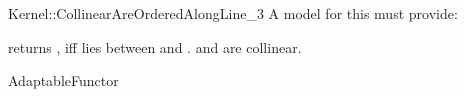 \begin{ccRefFunctionObjectConcept}{Kernel::CollinearAreOrderedAlongLine_3}
A model for this must provide:


         {returns , iff  lies between  
          and . \ccPrecond {} and  are 
          collinear.}

\ccRefines
AdaptableFunctor

\ccSeeAlso

  \\

\end{ccRefFunctionObjectConcept}
